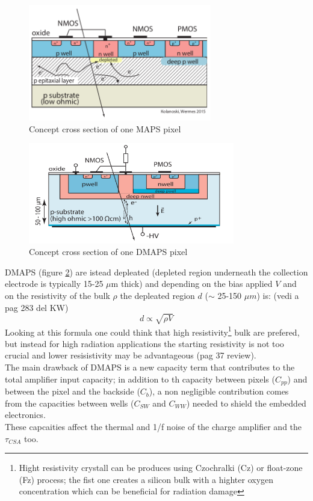 \begin{titlepage}
\begin{figure}
\centering\includegraphics[width=8cm]{figures/MAPS_scheme.png}
\caption{Concept cross section of one MAPS pixel}
\label{fig:MAPS_scheme}
\end{figure}
\begin{figure}
\centering\includegraphics[width=9cm]{figures/DMAPS_scheme.png}
\caption{Concept cross section of one DMAPS pixel}
\label{fig:DMAPS_scheme}
\end{figure}

DMAPS (figure \ref{fig:DMAPS_scheme}) are istead depleated (depleted region underneath
the collection electrode is typically 15-25 $\mu$m thick) and depending on the
bias applied $V$ and on the resistivity of the bulk $\rho$ the depleated region
$d$ ($\sim$ 25-150 $\mu m$) is: (vedi a pag 283 del KW)
\begin{equation}
   d \propto  \sqrt{ \rho V}
\end{equation}
Looking at this formula one could think that high resistivity\footnote{Hight resistivity
crystall can be produces using Czochralki (Cz) or float-zone (Fz) process;
the fist one creates a silicon bulk with a highter oxygen concentration
which can be beneficial for radiation damage} bulk are prefered, but
instead for high radiation applications the starting resistivity is not too crucial
and lower resisistivity may be advantageous (pag 37 review).\\

The main drawback of DMAPS is a new capacity term that contributes to the total
amplifier input capacity; in addition to th capacity between pixels ($C_{pp}$) and
between the pixel and the backside ($C_{b}$), a non negligible contribution comes
from the capacities between wells ($C_{SW}$ and $C_{WW}$) needed to shield the
embedded electronics.\\
These capcaities affect the thermal and 1/f noise of the charge amplifier and
the $ \tau_{CSA}$ too.\\


\end{titlepage}
